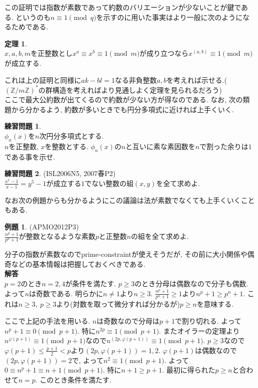 \documentclass{ltjsarticle}
\theoremstyle{definition}
\newtheorem{thm}{定理}
\newtheorem{prob}{練習問題}
\newtheorem{expr}{例題}
\begin{document}
この証明では指数が素数であって約数のバリエーションが少ないことが鍵である. というのも$n\equiv1\pmod q$を示すのに用いた事実はより一般に次のようになるためである.

\begin{thm}\ \\
$x,a,b,m$を正整数とし$x^a\equiv x^b\equiv 1\pmod m$が成り立つなら$x^{(a,b)}\equiv1\pmod m$が成立する.
\end{thm}

これは上の証明と同様に$ak-bl=1$なる非負整数$a,b$を考えれば示せる.($(\mathbb Z/m\mathbb Z)^*$の群構造を考えればより見通しよく定理を見られるだろう)\\
ここで最大公約数が出てくるので約数が少ない方が得なのである. なお, 次の類題から分かるよう, 約数が多いときでも円分多項式に近ければ上手くいく.

\begin{prob}\ \\
$\phi_n(x)$を$n$次円分多項式とする.\\
$n$を正整数, $x$を整数とする. $\phi_n(x)$の$n$と互いに素な素因数を$n$で割った余りは$1$である事を示せ.
\end{prob}

\begin{prob}(ISL2006N5, 2007春P2)\\
$\displaystyle\frac{x^7-1}{x-1}=y^5-1$が成立する$1$でない整数の組$(x,y)$を全て求めよ.
\end{prob}

なお次の例題からも分かるようにこの議論は法が素数でなくても上手くいくこともある. 
\begin{expr}(APMO2012P3)\\
$\displaystyle\frac{n^p+1}{p^n+1}$が整数となるような素数$p$と正整数$n$の組を全て求めよ.
\end{expr}

分子の指数が素数なのでprime-constraintが使えそうだが, その前に大小関係や偶奇などの基本情報は把握しておくべきである.\\
\textbf{解答}\\
$p=2$のとき$n=2,4$が条件を満たす. $p\geq3$のとき分母は偶数なので分子も偶数. よって$n$は奇数である. 明らかに$n\neq1$より$n\geq3$. $\displaystyle\frac{n^p+1}{p^n+1}\geq1$より$n^p+1\geq p^n+1$. これは$n\geq3,\ p\geq3$より(対数を取って微分すれば分かるが)$p\geq n$を意味する.

ここで上記の手法を用いる. $n$は奇数なので分母は$p+1$で割り切れる. よって$n^p+1\equiv0\pmod{p+1}$. 特に$n^{2p}\equiv1\pmod{p+1}$.  またオイラーの定理より$n^{\varphi(p+1)}\equiv1\pmod{p+1}$なので$n^{(2p,\varphi(p+1))}\equiv1\pmod{p+1}$. $p\geq3$なので$\displaystyle\varphi(p+1)\leq\frac{p+1}2<p$より$(2p,\varphi(p+1))=1,2$. $\varphi(p+1)$は偶数なので$(2p,\varphi(p+1))=2$で, よって$n^2\equiv1\pmod{p+1}$. よって$0\equiv n^p+1\equiv n+1\pmod{p+1}$. 特に$n+1\geq p+1$. 最初に得られた$p\geq n$と合わせて$n=p$. このとき条件を満たす.
\end{document}

